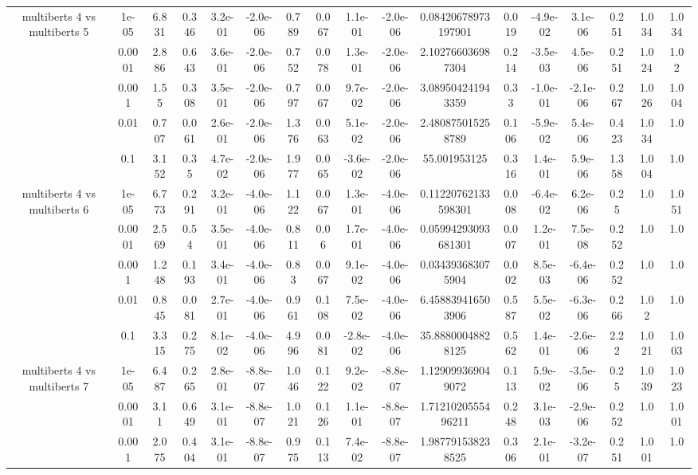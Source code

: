 \begin{tabular}{|c|c|c|c|c|c|c|c|c|c|c|c|c|c|c|c|c|}
\hline
\multirow{5}{*}{multiberts 4 vs multiberts 5} & 1e-05 & 6.831 & 0.346 & 3.2e-01 & -2.0e-06 & 0.789 & 0.067 & 1.1e-01 & -2.0e-06 & 0.08420678973197901 & 0.019 & -4.9e-02 & 3.1e-06 & 0.251 & 1.034 & 1.034 \\
 & 0.0001 & 2.886 & 0.643 & 3.6e-01 & -2.0e-06 & 0.752 & 0.078 & 1.3e-01 & -2.0e-06 & 2.102766036987304 & 0.214 & -3.5e-03 & 4.5e-06 & 0.251 & 1.024 & 1.02 \\
 & 0.001 & 1.55 & 0.308 & 3.5e-01 & -2.0e-06 & 0.797 & 0.067 & 9.7e-02 & -2.0e-06 & 3.089504241943359 & 0.33 & -1.0e-01 & -2.1e-06 & 0.267 & 1.026 & 1.004 \\
 & 0.01 & 0.707 & 0.061 & 2.6e-01 & -2.0e-06 & 1.376 & 0.063 & 5.1e-02 & -2.0e-06 & 2.480875015258789 & 0.106 & -5.9e-02 & 5.4e-06 & 0.423 & 1.034 & 1.0 \\
 & 0.1 & 3.152 & 0.35 & 4.7e-02 & -2.0e-06 & 1.977 & 0.065 & -3.6e-02 & -2.0e-06 & 55.001953125 & 0.316 & 1.4e-01 & 5.9e-06 & 1.358 & 1.004 & 1.0 \\
\hline
\multirow{5}{*}{multiberts 4 vs multiberts 6} & 1e-05 & 6.773 & 0.291 & 3.2e-01 & -4.0e-06 & 1.122 & 0.067 & 1.3e-01 & -4.0e-06 & 0.11220762133598301 & 0.008 & -6.4e-02 & 6.2e-06 & 0.25 & 1.0 & 1.051 \\
 & 0.0001 & 2.569 & 0.54 & 3.5e-01 & -4.0e-06 & 0.811 & 0.06 & 1.7e-01 & -4.0e-06 & 0.05994293093681301 & 0.007 & 1.2e-01 & 7.5e-08 & 0.252 & 1.0 & 1.0 \\
 & 0.001 & 1.248 & 0.193 & 3.4e-01 & -4.0e-06 & 0.83 & 0.067 & 9.1e-02 & -4.0e-06 & 0.034393683075904 & 0.002 & 8.5e-03 & -6.4e-06 & 0.252 & 1.0 & 1.0 \\
 & 0.01 & 0.845 & 0.081 & 2.7e-01 & -4.0e-06 & 0.961 & 0.108 & 7.5e-02 & -4.0e-06 & 6.458839416503906 & 0.587 & 5.5e-02 & -6.3e-06 & 0.266 & 1.02 & 1.0 \\
 & 0.1 & 3.315 & 0.275 & 8.1e-02 & -4.0e-06 & 4.996 & 0.081 & -2.8e-02 & -4.0e-06 & 35.88800048828125 & 0.562 & 1.4e-01 & -2.6e-06 & 2.22 & 1.021 & 1.003 \\
\hline
\multirow{5}{*}{multiberts 4 vs multiberts 7} & 1e-05 & 6.487 & 0.265 & 2.8e-01 & -8.8e-07 & 1.046 & 0.122 & 9.2e-02 & -8.8e-07 & 1.129099369049072 & 0.113 & 5.9e-02 & -3.5e-06 & 0.25 & 1.039 & 1.023 \\
 & 0.0001 & 3.11 & 0.649 & 3.1e-01 & -8.8e-07 & 1.021 & 0.126 & 1.1e-01 & -8.8e-07 & 1.7121020555496211 & 0.248 & 3.1e-03 & -2.9e-06 & 0.252 & 1.0 & 1.001 \\
 & 0.001 & 2.075 & 0.404 & 3.1e-01 & -8.8e-07 & 0.975 & 0.113 & 7.4e-02 & -8.8e-07 & 1.987791538238525 & 0.306 & 2.1e-01 & -3.2e-07 & 0.251 & 1.001 & 1.0 \\

\end{tabular}
